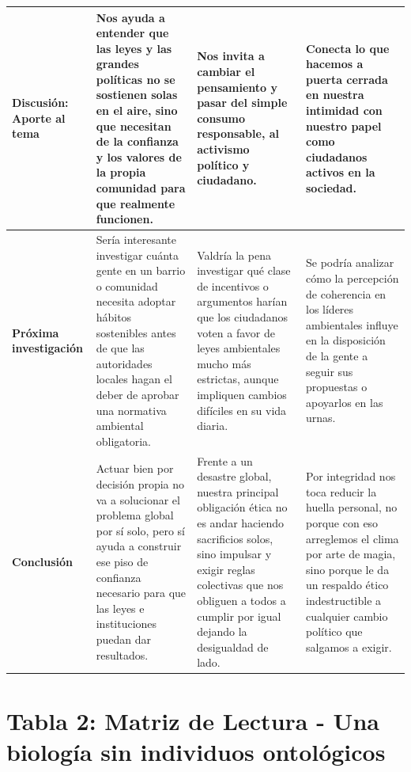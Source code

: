 \documentclass[12pt]{article}
\begin{document}
\begin{longtable}{|>{\raggedright\arraybackslash}p{3cm}|>{\raggedright\arraybackslash}p{4.2cm}|>{\raggedright\arraybackslash}p{4.2cm}|>{\raggedright\arraybackslash}p{4.2cm}|}
\hline
\textbf{Discusión: Aporte al tema} & Nos ayuda a entender que las leyes y las grandes políticas no se sostienen solas en el aire, sino que necesitan de la confianza y los valores de la propia comunidad para que realmente funcionen. & Nos invita a cambiar el pensamiento y pasar del simple consumo responsable, al activismo político y ciudadano. & Conecta lo que hacemos a puerta cerrada en nuestra intimidad con nuestro papel como ciudadanos activos en la sociedad. \\
\hline
\textbf{Próxima investigación} & Sería interesante investigar cuánta gente en un barrio o comunidad necesita adoptar hábitos sostenibles antes de que las autoridades locales hagan el deber de aprobar una normativa ambiental obligatoria. & Valdría la pena investigar qué clase de incentivos o argumentos harían que los ciudadanos voten a favor de leyes ambientales mucho más estrictas, aunque impliquen cambios difíciles en su vida diaria. & Se podría analizar cómo la percepción de coherencia en los líderes ambientales influye en la disposición de la gente a seguir sus propuestas o apoyarlos en las urnas. \\
\hline
\textbf{Conclusión} & Actuar bien por decisión propia no va a solucionar el problema global por sí solo, pero sí ayuda a construir ese piso de confianza necesario para que las leyes e instituciones puedan dar resultados. & Frente a un desastre global, nuestra principal obligación ética no es andar haciendo sacrificios solos, sino impulsar y exigir reglas colectivas que nos obliguen a todos a cumplir por igual dejando la desigualdad de lado. & Por integridad nos toca reducir la huella personal, no porque con eso arreglemos el clima por arte de magia, sino porque le da un respaldo ético indestructible a cualquier cambio político que salgamos a exigir. \\
\hline
\end{longtable}

\newpage

\section*{Tabla 2: Matriz de Lectura - Una biología sin individuos ontológicos}
\end{document}
